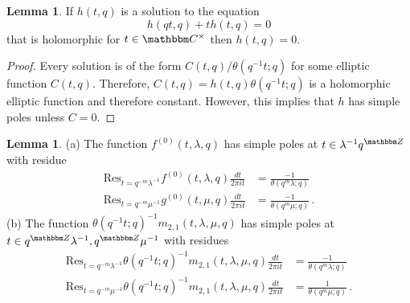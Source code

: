 \documentclass[12pt,reqno]{amsart}
\theoremstyle{definition}
\newtheorem{lemma}[theorem]{Lemma}
\def\BZ{\mathbbm Z}
\def\BC{\mathbbm C}
\def\Res{\mathrm{Res}}
\def\be{\begin{equation}}
\def\ee{\end{equation}}
\begin{document}
\begin{lemma}
\label{lem.vanish}
  If $h(t,q)$ is a solution to the equation
\be
\label{AL.hom.equ}
h(qt,q)+th(t,q)=0
\ee
that is holomorphic for $t\in\BC^{\times}$ then $h(t,q)=0$.
\end{lemma}

\begin{proof}
  Every solution is of the form $C(t,q)/\theta(q^{-1}t;q)$ for some elliptic
  function $C(t,q)$. Therefore, $C(t,q)=h(t,q)\theta(q^{-1}t;q)$ is a
  holomorphic elliptic function and therefore constant. However, this implies
  that $h$ has simple poles unless $C=0$.
\end{proof}

\begin{lemma}
  \label{lem.resAL}
  \rm{(a)} The function $f^{(0)}(t,\lambda,q)$ has simple poles at
$t\in \lambda^{-1}q^{\BZ}$ with residue
\be
\begin{aligned}
\Res_{t=q^{-m}\lambda^{-1}}f^{(0)}(t,\lambda,q)\frac{dt}{2\pi it}
&=
\frac{-1}{\theta(q^{m}\lambda;q)}\\
\Res_{t=q^{-m}\mu^{-1}}g^{(0)}(t,\mu,q)\frac{dt}{2\pi it}
&=
\frac{-1}{\theta(q^{m}\mu;q)} \,.
\end{aligned}
\ee
  \rm{(b)}
  The function $\theta(q^{-1}t;q)^{-1}m_{2,1}(t,\lambda,\mu,q)$ has simple
  poles at $t\in q^{\BZ}\lambda^{-1},q^{\BZ}\mu^{-1}$ with residues
  \be
\begin{aligned}
  \Res_{t=q^{-m}\lambda^{-1}}\theta(q^{-1}t;q)^{-1}
  m_{2,1}(t,\lambda,\mu,q)\frac{dt}{2\pi it}
&=
\frac{-1}{\theta(q^{m}\lambda;q)}\\
\Res_{t=q^{-m}\mu^{-1}}\theta(q^{-1}t;q)^{-1}
m_{2,1}(t,\lambda,\mu,q)\frac{dt}{2\pi it}
&=
\frac{1}{\theta(q^{m}\mu;q)}\,.
\end{aligned}
\ee
\end{lemma}
\end{document}
